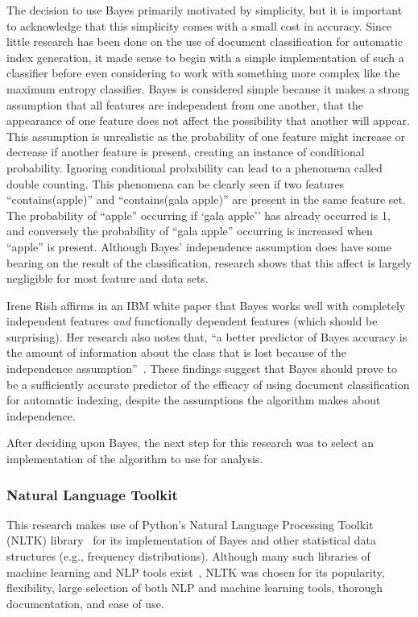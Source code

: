 The decision to use \naive Bayes primarily motivated by simplicity, but it is important to acknowledge that this simplicity comes with a small cost in accuracy.
Since little research has been done on the use of document classification for automatic index generation, it made sense to begin with a simple implementation of such a classifier before even considering to work with something more complex like the maximum entropy classifier.
\Naive Bayes is considered simple because it makes a strong assumption that all features are independent from one another, that the appearance of one feature does not affect the possibility that another will appear.
This assumption is unrealistic as the probability of one feature might increase or decrease if another feature is present, creating an instance of conditional probability.
Ignoring conditional probability can lead to a phenomena called double counting.
This phenomena can be clearly seen if two features ``contains(apple)'' and ``contains(gala apple)'' are present in the same feature set.
The probability of ``apple'' occurring if `gala apple'' has already occurred is 1, and conversely the probability of ``gala apple'' occurring is increased when ``apple'' is present.
Although \naive Bayes' independence assumption does have some bearing on the result of the classification, research shows that this affect is largely negligible for most feature and data sets.

Irene Rish affirms in an IBM white paper that \naive Bayes works well with completely independent features {\it and} functionally dependent features (which should be surprising).
Her research also notes that, ``a better predictor of \naive Bayes accuracy is the amount of information about the class that is lost because of the independence assumption''~\cite{rish}.
These findings suggest that \naive Bayes should prove to be a sufficiently accurate predictor of the efficacy of using document classification for automatic indexing, despite the assumptions the algorithm makes about independence.

After deciding upon \naive Bayes, the next step for this research was to select an implementation of the algorithm to use for analysis.

\subsubsection{Natural Language Toolkit}
\label{sec:nltk}

This research makes use of Python's Natural Language Processing Toolkit (NLTK) library~\cite{nltk} for its implementation of \naive Bayes and other statistical data structures (e.g., frequency distributions).
Although many such libraries of machine learning and NLP tools exist~\cite{stanford-nlp,open-nlp}, NLTK was chosen for its popularity, flexibility, large selection of both NLP and machine learning tools, thorough documentation, and ease of use.

